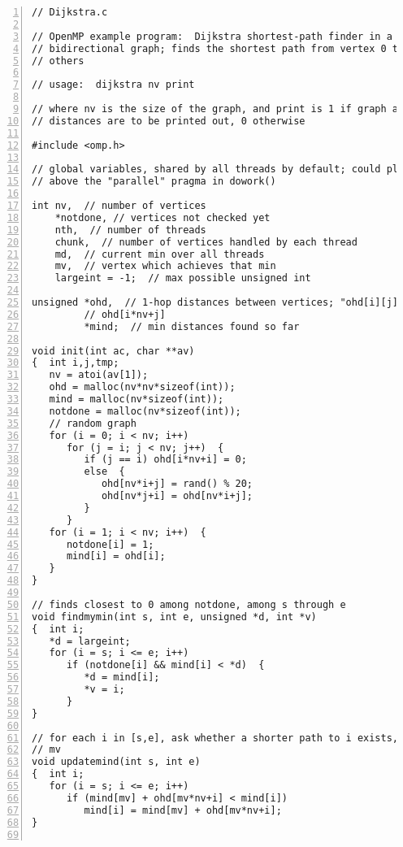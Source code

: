 \begin{Verbatim}[fontsize=\relsize{-2},numbers=left]
// Dijkstra.c

// OpenMP example program:  Dijkstra shortest-path finder in a
// bidirectional graph; finds the shortest path from vertex 0 to all
// others

// usage:  dijkstra nv print

// where nv is the size of the graph, and print is 1 if graph and min
// distances are to be printed out, 0 otherwise

#include <omp.h>

// global variables, shared by all threads by default; could placed them
// above the "parallel" pragma in dowork()

int nv,  // number of vertices
    *notdone, // vertices not checked yet
    nth,  // number of threads
    chunk,  // number of vertices handled by each thread
    md,  // current min over all threads
    mv,  // vertex which achieves that min
    largeint = -1;  // max possible unsigned int

unsigned *ohd,  // 1-hop distances between vertices; "ohd[i][j]" is
         // ohd[i*nv+j]
         *mind;  // min distances found so far

void init(int ac, char **av)
{  int i,j,tmp;
   nv = atoi(av[1]);
   ohd = malloc(nv*nv*sizeof(int));
   mind = malloc(nv*sizeof(int));
   notdone = malloc(nv*sizeof(int));
   // random graph
   for (i = 0; i < nv; i++)
      for (j = i; j < nv; j++)  {
         if (j == i) ohd[i*nv+i] = 0;
         else  {
            ohd[nv*i+j] = rand() % 20;
            ohd[nv*j+i] = ohd[nv*i+j];
         }
      }
   for (i = 1; i < nv; i++)  {
      notdone[i] = 1;
      mind[i] = ohd[i];
   }
}

// finds closest to 0 among notdone, among s through e
void findmymin(int s, int e, unsigned *d, int *v)
{  int i;
   *d = largeint;
   for (i = s; i <= e; i++)
      if (notdone[i] && mind[i] < *d)  {
         *d = mind[i];
         *v = i;
      }
}

// for each i in [s,e], ask whether a shorter path to i exists, through
// mv
void updatemind(int s, int e)
{  int i;
   for (i = s; i <= e; i++)
      if (mind[mv] + ohd[mv*nv+i] < mind[i])
         mind[i] = mind[mv] + ohd[mv*nv+i];
}


\end{Verbatim}
